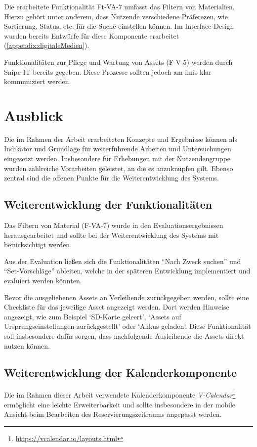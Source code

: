 Die erarbeitete Funktionalität Ft-VA-7 umfasst das Filtern von Materialien. Hierzu gehört unter
anderem, dass Nutzende verschiedene Präferezen, wie Sortierung, Status, etc. für die Suche
einstellen können. Im Interface-Design wurden bereits Entwürfe für diese Komponente erarbeitet
(\ref{appendix:digitaleMedien}).

Funktionalitäten zur Pflege und Wartung von Assets (F-V-5) werden durch Snipe-IT bereits gegeben.
Diese Prozesse sollten jedoch am \ac{imis} klar kommuniziert werden.


\section{Ausblick}
Die im Rahmen der Arbeit erarbeiteten Konzepte und Ergebnisse können als Indikator und Grundlage für
weiterführende Arbeiten und Untersuchungen eingesetzt werden. Insbesondere für Erhebungen mit der
Nutzendengruppe wurden zahlreiche Vorarbeiten geleistet, an die es anzuknüpfen gilt. Ebenso zentral
sind die offenen Punkte für die Weiterentwicklung des Systems.

\subsection{Weiterentwicklung der Funktionalitäten}
Das Filtern von Material (F-VA-7) wurde in den Evaluationsergebnissen
herausgearbeitet und sollte bei der Weiterentwicklung des Systems mit
berücksichtigt werden.

Aus der Evaluation ließen sich die Funktionalitäten \enquote{Nach Zweck suchen}
und \enquote{Set-Vorschläge} ableiten, welche in der späteren Entwicklung
implementiert und evaluiert werden könnten.

Bevor die ausgeliehenen Assets an Verleihende zurückgegeben werden, sollte eine
Checkliste für das jeweilige Asset angezeigt  werden. Dort werden Hinweise angezeigt,
wie zum Beispiel \enquote*{SD-Karte geleert}, \enquote*{Assets auf Ursprungseinstellungen
zurückgestellt} oder \enquote*{Akkus geladen}. Diese Funktionalität soll insbesondere dafür
sorgen, dass nachfolgende Ausleihende die Assets direkt nutzen können.

\subsection{Weiterentwicklung der Kalenderkomponente}
Die im Rahmen dieser Arbeit verwendete Kalenderkomponente
\textit{V-Calendar}\footnote{\url{https://vcalendar.io/layouts.html}} ermöglicht
eine leichte Erweiterbarkeit und sollte insbesondere in der mobile Ansicht beim
Bearbeiten des Reservierungszeitraums angepasst werden.

